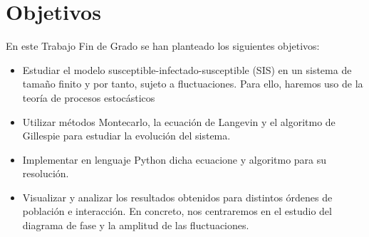 \chapter{Objetivos}\label{ch:Objetivos}
En este Trabajo Fin de Grado se han planteado los siguientes objetivos:
\begin{itemize}
    \item Estudiar el modelo susceptible-infectado-susceptible (SIS) en un sistema de tamaño finito y    por tanto, sujeto a fluctuaciones. Para ello, haremos uso de la teoría de procesos estocásticos
    \item Utilizar métodos Montecarlo, la ecuación de Langevin y el algoritmo de Gillespie para estudiar la evolución del sistema.
    \item Implementar en lenguaje Python dicha ecuacione y algoritmo para su resolución.
    \item Visualizar y analizar los resultados obtenidos para distintos órdenes de población e interacción. En concreto, nos centraremos en el estudio del diagrama de fase y la amplitud de las fluctuaciones.
\end{itemize}